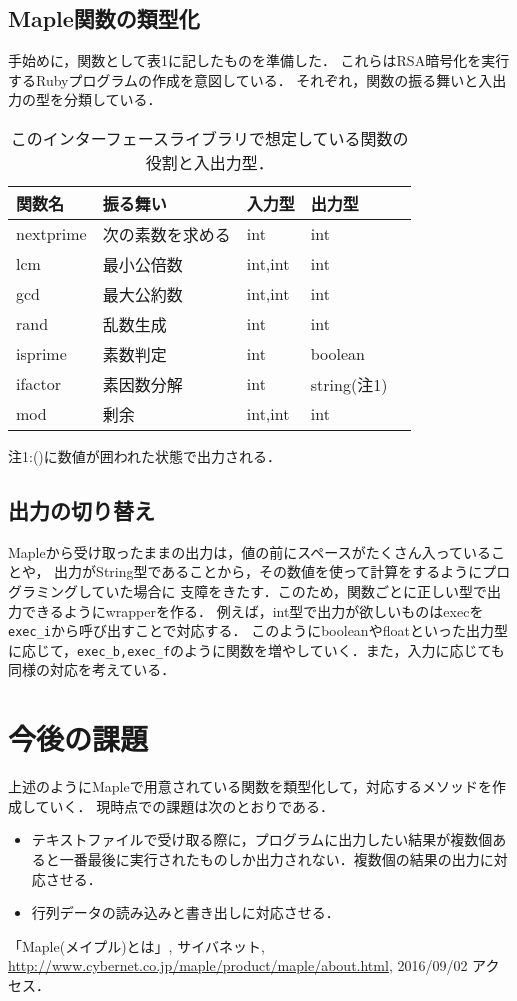 \documentclass[10pt,a4j,twocolumn]{jsarticle}
\begin{document}
\subsection{Maple関数の類型化}
手始めに，関数として表1に記したものを準備した．
これらはRSA暗号化を実行するRubyプログラムの作成を意図している．
それぞれ，関数の振る舞いと入出力の型を分類している．
\begin{table}[htbp]\begin{center}
\caption{このインターフェースライブラリで想定している関数の役割と入出力型．}
\begin{tabular}{lllll}
\hline
関数名  &振る舞い  &入力型  &出力型  \\ \hline
nextprime  &次の素数を求める  &int  &int  \\
lcm  &最小公倍数  &int,int  &int  \\
gcd  &最大公約数  &int,int  &int  \\
rand  &乱数生成  &int  &int  \\
isprime  &素数判定  &int  &boolean  \\
ifactor  &素因数分解  &int  &string{\footnotesize (注1)}  \\
mod  &剰余  &int,int  &int  \\
\hline
\end{tabular}
\end{center}
{\footnotesize 注1:()に数値が囲われた状態で出力される．}
\label{default}
\end{table}

\subsection{出力の切り替え}
Mapleから受け取ったままの出力は，値の前にスペースがたくさん入っていることや，
出力がString型であることから，その数値を使って計算をするようにプログラミングしていた場合に
支障をきたす．このため，関数ごとに正しい型で出力できるようにwrapperを作る．
例えば，int型で出力が欲しいものはexecを\verb|exec_i|から呼び出すことで対応する．
このようにbooleanやfloatといった出力型に応じて，\verb|exec_b,exec_f|のように関数を増やしていく．また，入力に応じても同様の対応を考えている．

\section{今後の課題}
上述のようにMapleで用意されている関数を類型化して，対応するメソッドを作成していく．
現時点での課題は次のとおりである．
\begin{itemize}
\item テキストファイルで受け取る際に，プログラムに出力したい結果が複数個あると一番最後に実行されたものしか出力されない．複数個の結果の出力に対応させる．
\item 行列データの読み込みと書き出しに対応させる．
\end{itemize}

\begin{flushleft}
\begin{thebibliography}{9}
「Maple(メイプル)とは」, サイバネット, \url{http://www.cybernet.co.jp/maple/product/maple/about.html}, 2016/09/02 アクセス．
\end{thebibliography}
\end{flushleft}
\end{document}
